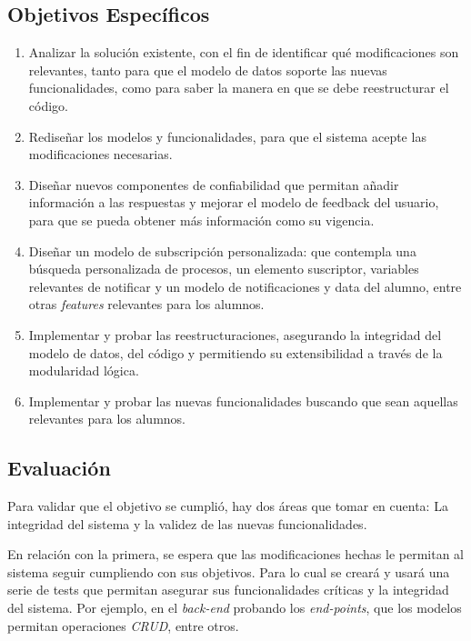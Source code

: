     \subsection*{Objetivos Específicos}\label{sec:obj-e}
        \begin{enumerate}
            \item Analizar la solución existente, con el fin de identificar qué modificaciones son relevantes, tanto para que el modelo de datos soporte las nuevas funcionalidades, como para saber la manera en que se debe reestructurar el código.
            
            \item Rediseñar los modelos y funcionalidades, para que el sistema acepte las modificaciones necesarias.
            
            \item Diseñar nuevos componentes de confiabilidad que permitan añadir información a las respuestas y mejorar el modelo de feedback del usuario, para que se pueda obtener más información como su vigencia.
            
            \item Diseñar un modelo de subscripción personalizada: que contempla una búsqueda personalizada de procesos, un elemento suscriptor, variables relevantes de notificar y un modelo de notificaciones y data del alumno, entre otras \textit{features} relevantes para los alumnos.
            
            \item Implementar y probar las reestructuraciones, asegurando la integridad del modelo de datos, del código y permitiendo su extensibilidad a través de la modularidad lógica.
            
            \item Implementar y probar las nuevas funcionalidades buscando que sean aquellas relevantes para los alumnos.
        \end{enumerate}
         
    \subsection*{Evaluación}\label{sec:eval}
    Para validar que el objetivo se cumplió, hay dos áreas que tomar en cuenta: La integridad del sistema y la validez de las nuevas funcionalidades.
    \par En relación con la primera, se espera que las modificaciones hechas le permitan al sistema seguir cumpliendo con sus objetivos. Para lo cual se creará y usará una serie de tests que permitan asegurar sus funcionalidades críticas y la integridad del sistema. Por ejemplo, en el \textit{back-end} probando los \textit{end-points}, que los modelos permitan operaciones \textit{CRUD}, entre otros.
    
